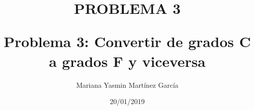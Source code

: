 \documentclass{article}
\title{\Huge\item\color{orange}\textbf{PROBLEMA 3 }}
\author{\Large Mariana Yasmin Martínez García}
\date{\Large 20/01/2019}
\begin{document}
\begin{figure}[t]
	\centering
	\caption{}
	\label{fig:1}
\end{figure}





	\maketitle
		
	\newpage
	
	\title{\huge\textbf{Problema 3: Convertir de grados C a  grados F y viceversa }} \\
\end{document}
